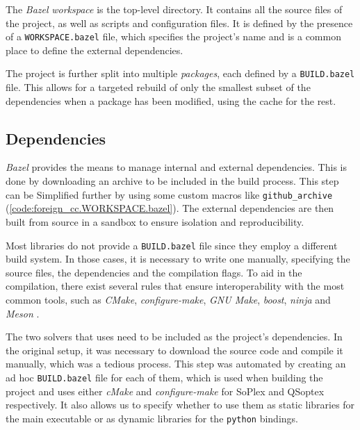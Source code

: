 The \textit{Bazel} \textit{workspace} is the top-level directory.
It contains all the source files of the project, as well as scripts and configuration files.
It is defined by the presence of a \texttt{WORKSPACE.bazel} file, which specifies the project's name and is a common place to define the external dependencies.



The project is further split into multiple \textit{packages}, each defined by a \texttt{BUILD.bazel} file.
This allows for a targeted rebuild of only the smallest subset of the dependencies when a package has been modified, using the cache for the rest.



\subsection*{Dependencies}

\textit{Bazel} provides the means to manage internal and external dependencies.
This is done by downloading an archive to be included in the build process.
This step can be Simplified further by using some custom macros like \texttt{github\_archive} (\autoref{code:foreign_cc.WORKSPACE.bazel}).
The external dependencies are then built from source in a sandbox to ensure isolation and reproducibility.

Most libraries do not provide a \texttt{BUILD.bazel} file since they employ a different build system.
In those cases, it is necessary to write one manually, specifying the source files, the dependencies and the compilation flags.
To aid in the compilation, there exist several rules that ensure interoperability with the most common tools, such as \textit{CMake}, \textit{configure-make}, \textit{GNU Make}, \textit{boost}, \textit{ninja} and \textit{Meson} \cite{repo:rules-foreign-cc}.



The two solvers that \dlinear uses need to be included as the project's dependencies.
In the original setup, it was necessary to download the source code and compile it manually, which was a tedious process.
This step was automated by creating an ad hoc \texttt{BUILD.bazel} file for each of them, which is used when building the project and uses either \textit{cMake} and \textit{configure-make} for SoPlex and QSoptex respectively.
It also allows us to specify whether to use them as static libraries for the main executable or as dynamic libraries for the \texttt{python} bindings.

